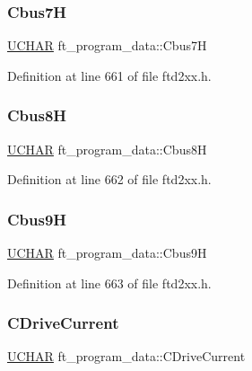 \subsubsection{\texorpdfstring{Cbus7H}{Cbus7H}}
{\footnotesize\ttfamily \hyperlink{CatCaloProto40MHz_2inc_2WinTypes_8h_a4f4bb67531a9bf6f0b9c6ad76aeba587}{U\+C\+H\+AR} ft\+\_\+program\+\_\+data\+::\+Cbus7H}



Definition at line 661 of file ftd2xx.\+h.

\mbox{\label{structft__program__data_aafd97398ad5b8ac453ded17e2b777938}} 
\subsubsection{\texorpdfstring{Cbus8H}{Cbus8H}}
{\footnotesize\ttfamily \hyperlink{CatCaloProto40MHz_2inc_2WinTypes_8h_a4f4bb67531a9bf6f0b9c6ad76aeba587}{U\+C\+H\+AR} ft\+\_\+program\+\_\+data\+::\+Cbus8H}



Definition at line 662 of file ftd2xx.\+h.

\mbox{\label{structft__program__data_a707c521299114d1d4903d6286b6b07e8}} 
\subsubsection{\texorpdfstring{Cbus9H}{Cbus9H}}
{\footnotesize\ttfamily \hyperlink{CatCaloProto40MHz_2inc_2WinTypes_8h_a4f4bb67531a9bf6f0b9c6ad76aeba587}{U\+C\+H\+AR} ft\+\_\+program\+\_\+data\+::\+Cbus9H}



Definition at line 663 of file ftd2xx.\+h.

\mbox{\label{structft__program__data_a5128f7c002f6dad43f6f76895de512b3}} 
\subsubsection{\texorpdfstring{C\+Drive\+Current}{CDriveCurrent}}
{\footnotesize\ttfamily \hyperlink{CatCaloProto40MHz_2inc_2WinTypes_8h_a4f4bb67531a9bf6f0b9c6ad76aeba587}{U\+C\+H\+AR} ft\+\_\+program\+\_\+data\+::\+C\+Drive\+Current}



